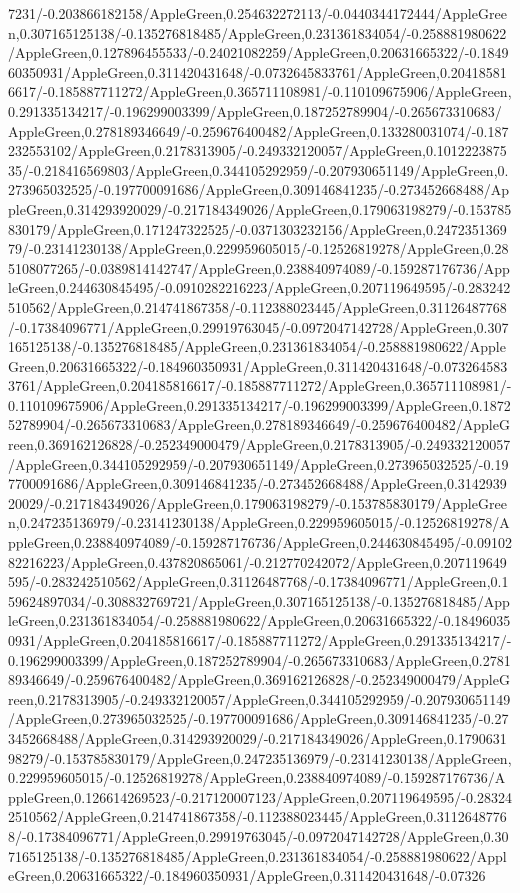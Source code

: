 {\begin{tikzternal}
{7231/-0.203866182158/AppleGreen,0.254632272113/-0.0440344172444/AppleGreen,0.307165125138/-0.135276818485/AppleGreen,0.231361834054/-0.258881980622/AppleGreen,0.127896455533/-0.24021082259/AppleGreen,0.20631665322/-0.184960350931/AppleGreen,0.311420431648/-0.0732645833761/AppleGreen,0.204185816617/-0.185887711272/AppleGreen,0.365711108981/-0.110109675906/AppleGreen,0.291335134217/-0.196299003399/AppleGreen,0.187252789904/-0.265673310683/AppleGreen,0.278189346649/-0.259676400482/AppleGreen,0.133280031074/-0.187232553102/AppleGreen,0.2178313905/-0.249332120057/AppleGreen,0.101222387535/-0.218416569803/AppleGreen,0.344105292959/-0.207930651149/AppleGreen,0.273965032525/-0.197700091686/AppleGreen,0.309146841235/-0.273452668488/AppleGreen,0.314293920029/-0.217184349026/AppleGreen,0.179063198279/-0.153785830179/AppleGreen,0.171247322525/-0.0371303232156/AppleGreen,0.247235136979/-0.23141230138/AppleGreen,0.229959605015/-0.12526819278/AppleGreen,0.285108077265/-0.0389814142747/AppleGreen,0.238840974089/-0.159287176736/AppleGreen,0.244630845495/-0.0910282216223/AppleGreen,0.207119649595/-0.283242510562/AppleGreen,0.214741867358/-0.112388023445/AppleGreen,0.31126487768/-0.17384096771/AppleGreen,0.29919763045/-0.0972047142728/AppleGreen,0.307165125138/-0.135276818485/AppleGreen,0.231361834054/-0.258881980622/AppleGreen,0.20631665322/-0.184960350931/AppleGreen,0.311420431648/-0.0732645833761/AppleGreen,0.204185816617/-0.185887711272/AppleGreen,0.365711108981/-0.110109675906/AppleGreen,0.291335134217/-0.196299003399/AppleGreen,0.187252789904/-0.265673310683/AppleGreen,0.278189346649/-0.259676400482/AppleGreen,0.369162126828/-0.252349000479/AppleGreen,0.2178313905/-0.249332120057/AppleGreen,0.344105292959/-0.207930651149/AppleGreen,0.273965032525/-0.197700091686/AppleGreen,0.309146841235/-0.273452668488/AppleGreen,0.314293920029/-0.217184349026/AppleGreen,0.179063198279/-0.153785830179/AppleGreen,0.247235136979/-0.23141230138/AppleGreen,0.229959605015/-0.12526819278/AppleGreen,0.238840974089/-0.159287176736/AppleGreen,0.244630845495/-0.0910282216223/AppleGreen,0.437820865061/-0.212770242072/AppleGreen,0.207119649595/-0.283242510562/AppleGreen,0.31126487768/-0.17384096771/AppleGreen,0.159624897034/-0.308832769721/AppleGreen,0.307165125138/-0.135276818485/AppleGreen,0.231361834054/-0.258881980622/AppleGreen,0.20631665322/-0.184960350931/AppleGreen,0.204185816617/-0.185887711272/AppleGreen,0.291335134217/-0.196299003399/AppleGreen,0.187252789904/-0.265673310683/AppleGreen,0.278189346649/-0.259676400482/AppleGreen,0.369162126828/-0.252349000479/AppleGreen,0.2178313905/-0.249332120057/AppleGreen,0.344105292959/-0.207930651149/AppleGreen,0.273965032525/-0.197700091686/AppleGreen,0.309146841235/-0.273452668488/AppleGreen,0.314293920029/-0.217184349026/AppleGreen,0.179063198279/-0.153785830179/AppleGreen,0.247235136979/-0.23141230138/AppleGreen,0.229959605015/-0.12526819278/AppleGreen,0.238840974089/-0.159287176736/AppleGreen,0.126614269523/-0.217120007123/AppleGreen,0.207119649595/-0.283242510562/AppleGreen,0.214741867358/-0.112388023445/AppleGreen,0.31126487768/-0.17384096771/AppleGreen,0.29919763045/-0.0972047142728/AppleGreen,0.307165125138/-0.135276818485/AppleGreen,0.231361834054/-0.258881980622/AppleGreen,0.20631665322/-0.184960350931/AppleGreen,0.311420431648/-0.07326}
\end{tikzternal}}
